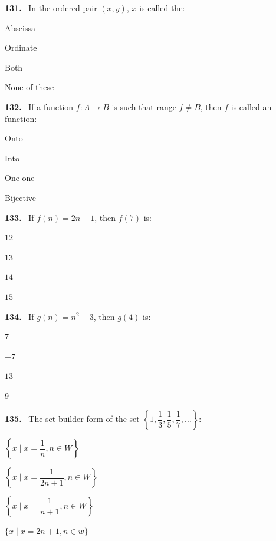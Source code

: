 \documentclass[11pt]{article}
\newenvironment{qenv}[1]{%
  \par\medskip\noindent\textbf{#1.}\ \ignorespaces
}{\par}
\begin{document}
\begin{qenv}{131} In the ordered pair $(x,y)$, $x$ is called the:
\begin{options} \item Abscissa \item Ordinate \item Both \item None of these \end{options} \end{qenv}

\begin{qenv}{132} If a function $f:A\to B$ is such that range $f \neq B$, then $f$ is called an \underline{\hspace{2cm}} function:
\begin{options} \item Onto \item Into \item One-one \item Bijective \end{options} \end{qenv}

\begin{qenv}{133} If $f(n)=2n-1$, then $f(7)$ is:
\begin{options} \item $12$ \item $13$ \item $14$ \item $15$ \end{options} \end{qenv}

\begin{qenv}{134} If $g(n)=n^2-3$, then $g(4)$ is:
\begin{options} \item $7$ \item $-7$ \item $13$ \item $9$ \end{options} \end{qenv}

\begin{qenv}{135} The set-builder form of the set $\left\{1,\dfrac{1}{3},\dfrac{1}{5},\dfrac{1}{7},\ldots\right\}$:
\begin{options} \item $\left\{x \mid x=\dfrac{1}{n}, n\in W\right\}$ \item $\left\{x \mid x=\dfrac{1}{2n+1}, n\in W\right\}$ \item $\left\{x \mid x=\dfrac{1}{n+1}, n\in W\right\}$ \item $\{x \mid x=2n+1, n\in w\}$ \end{options} \end{qenv}
\end{document}
